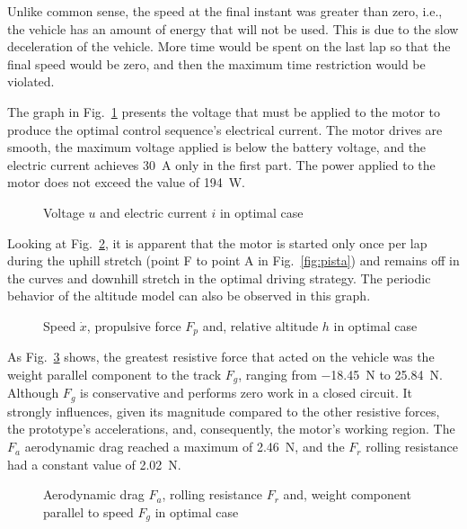 Unlike common sense, the speed at the final instant was greater than zero, i.e., the vehicle has an amount of energy that will not be used. 
This is due to the slow deceleration of the vehicle. More time would be spent on the last lap so that the final speed would be zero, and then the maximum time restriction would be violated.

The graph in Fig.~\ref{graf:controle} presents the voltage that must be applied to the motor to produce the optimal control sequence's electrical current.
The motor drives are smooth, the maximum voltage applied is below the battery voltage, and the electric current achieves \SI{30}{\ampere} only in the first part.
The power applied to the motor does not exceed the value of \SI{194}{\watt}.

\begin{figure}[H]
    \centering
    
    \caption{Voltage $u$ and electric current $i$ in optimal case}
    \label{graf:controle}
\end{figure}

Looking at Fig.~\ref{graf:resultadoOCP}, it is apparent that the motor is started only once per lap during the uphill stretch 
(point F to point A in Fig.~\ref{fig:pista}) and remains off in the curves and downhill stretch in the optimal driving strategy.
The periodic behavior of the altitude model can also be observed in this graph.

\begin{figure}[H]
    \centering
    
    \caption{Speed $\dot x$, propulsive force $F_p$ and, relative altitude $h$ in optimal case}
    \label{graf:resultadoOCP}
\end{figure}

As Fig.~\ref{graf:resultadoForcas} shows, 
the greatest resistive force that acted on the vehicle was the weight parallel component to the track $F_g$, ranging from \SI{-18.45}{\newton} to \SI{25.84}{\newton}. 
Although $F_g$ is conservative and performs zero work in a closed circuit. It strongly influences, 
given its magnitude compared to the other resistive forces, the prototype's accelerations, and, consequently, 
the motor's working region. 
The $F_a$ aerodynamic drag reached a maximum of \SI{2.46}{\newton}, and the $F_r$ rolling resistance had a constant value of \SI{2.02}{\newton}.

\begin{figure}[H]
    \centering
    
    \caption{Aerodynamic drag $F_a$, rolling resistance $F_r$ and, weight component parallel to speed $F_g$ in optimal case}
    \label{graf:resultadoForcas}
\end{figure}


